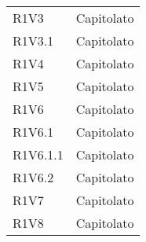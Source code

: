 \begin{longtable}{|C{6.5cm}|C{6.5cm}|}
	R1V3 & Capitolato \\

	R1V3.1 & Capitolato \\

	R1V4 & Capitolato \\

	R1V5 & Capitolato \\

	R1V6 & Capitolato \\

	R1V6.1 & Capitolato \\

	R1V6.1.1 & Capitolato \\

	R1V6.2 & Capitolato \\

	R1V7 & Capitolato \\
	R1V8 & Capitolato \\

	\hline

\end{longtable}
